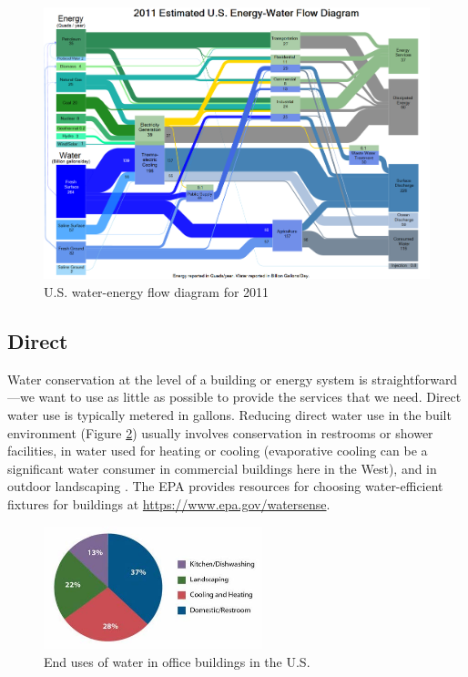 \documentclass[10pt]{article}
\begin{document}
            \begin{figure}[h]
            \includegraphics[width=6.5in]{extras18/energy-watersankey.png}
            \caption{U.S. water-energy flow diagram for 2011 \cite{waterenergynexus}}
            \label{sankey}
            \end{figure}



\subsection{Direct}


Water conservation at the level of a building or energy system is straightforward---we want to use as little as possible to provide the services that we need. Direct water use is typically metered in gallons. 
Reducing direct water use in the built environment (Figure \ref{weu}) usually involves conservation in restrooms or shower facilities, in water used for heating or cooling (evaporative cooling can be a significant water consumer in commercial buildings here in the West), and in outdoor landscaping \cite{noauthor_2012-sd}. The EPA provides resources for choosing water-efficient fixtures for buildings  at \url{https://www.epa.gov/watersense}.

\begin{figure}[h]
\centering
\includegraphics[width=2.5in]{extras18/weucb.jpg}
\caption{End uses of water in office buildings in the U.S. \cite{eGRIDsupportdoc2016}}
\label{weu}
\end{figure}
\end{document}
